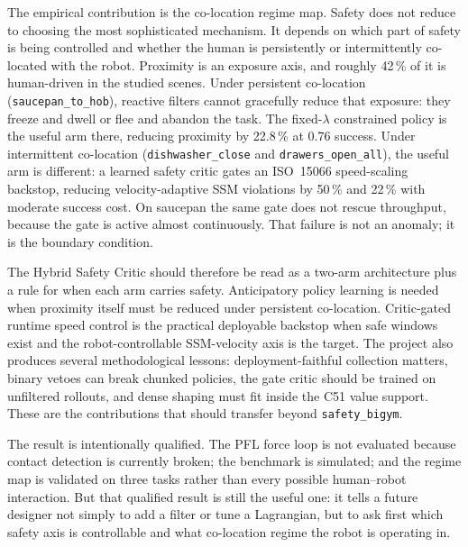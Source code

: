 \documentclass[11pt,a4paper]{report}
\newcommand{\ssm}{SSM}
\newcommand{\pfl}{PFL}
\newcommand{\iso}{ISO~15066}
\newcommand{\sbigym}{\texttt{safety\_bigym}}
\begin{document}
\noindent
The empirical contribution is the co-location regime map. Safety does
not reduce to choosing the most sophisticated mechanism. It depends on
which part of safety is being controlled and whether the human is
persistently or intermittently co-located with the robot. Proximity is
an exposure axis, and roughly 42\,\% of it is human-driven in the
studied scenes. Under persistent co-location
(\texttt{saucepan\_to\_hob}), reactive filters cannot gracefully reduce
that exposure: they freeze and dwell or flee and abandon the task. The
fixed-$\lambda$ constrained policy is the useful arm there, reducing
proximity by 22.8\,\% at 0.76 success. Under intermittent co-location
(\texttt{dishwasher\_close} and \texttt{drawers\_open\_all}), the
useful arm is different: a learned safety critic gates an
\iso{} speed-scaling backstop, reducing velocity-adaptive \ssm{}
violations by 50\,\% and 22\,\% with moderate success cost. On
saucepan the same gate does not rescue throughput, because the gate is
active almost continuously. That failure is not an anomaly; it is the
boundary condition.

\noindent
The Hybrid Safety Critic should therefore be read as a two-arm
architecture plus a rule for when each arm carries safety. Anticipatory
policy learning is needed when proximity itself must be reduced under
persistent co-location. Critic-gated runtime speed control is the
practical deployable backstop when safe windows exist and the
robot-controllable SSM-velocity axis is the target. The project also
produces several methodological lessons: deployment-faithful collection
matters, binary vetoes can break chunked policies, the gate critic
should be trained on unfiltered rollouts, and dense shaping must fit
inside the C51 value support. These are the contributions that should
transfer beyond \sbigym{}.

\noindent
The result is intentionally qualified. The \pfl{} force loop is not
evaluated because contact detection is currently broken; the benchmark
is simulated; and the regime map is validated on three tasks rather
than every possible human--robot interaction. But that qualified result
is still the useful one: it tells a future designer not simply to add a
filter or tune a Lagrangian, but to ask first which safety axis is
controllable and what co-location regime the robot is operating in.
\end{document}
